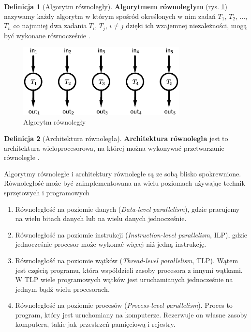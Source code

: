 \documentclass[a4paper,oneside,leqno,12pt]{book}
\theoremstyle{definition}
\newtheorem{definicja}{Definicja}[chapter]
\theoremstyle{plain}
\theoremstyle{remark}
\begin{document}
\begin{definicja}[Algorytm równoległy]\label{def:algorytm_rownolegly}
\textbf{Algorytmem równoległym} (rys.  \ref{fig:parallel}) nazywamy każdy algorytm w którym spośród określonych w nim zadań \(T_1\), \(T_2\), \(\dots\), \(T_n\) co najmniej dwa zadania \(T_i\), \(T_j\), \(i\neq j\) dzięki ich wzajemnej niezależności, mogą być wykonane równocześnie \cite{APC2011}.\\
\end{definicja}

\begin{figure}[h]
\centering
\includegraphics[width=23em]{./images/Rys1.eps}
\caption{Algorytm równoległy}
\label{fig:parallel}
\end{figure}

\begin{definicja}[Architektura równoległa]\label{def:arch_rownolegla}
\textbf{Architektura równoległa} jest to architektura wieloprocesorowa, na której można wykonywać przetwarzanie równoległe \cite{IEEE}.
\end{definicja}

Algorytmy równoległe i architektury równoległe są ze sobą blisko spokrewnione. Równoległość może być zaimplementowana na wielu poziomach używając technik sprzętowych i programowych\cite{APC2011}
\begin{enumerate}
\item{Równoległość na poziomie danych (\emph{Data-level parallelism}), gdzie pracujemy na wielu bitach danych lub na wielu danych jednocześnie.}
\item{Równoległość na poziomie instrukcji (\emph{Instruction-level parallelism}, ILP), gdzie jednocześnie procesor może wykonać więcej niż jedną instrukcję.}
\item{Równoległość na poziomie wątków (\emph{Thread-level parallelism}, TLP). Wątem jest częścią programu, która współdzieli zasoby procesora z innymi wątkami. W TLP wiele programowych wątków jest uruchamianych jednocześnie na jednym bądź wielu procesorach.}
\item{Równoległość na poziomie procesów (\emph{Process-level parallelism}). Proces to program, który jest uruchomiany na komputerze. Rezerwuje on własne zasoby komputera, takie jak przestrzeń pamięciową i rejestry.}
\end{enumerate}
\end{document}
